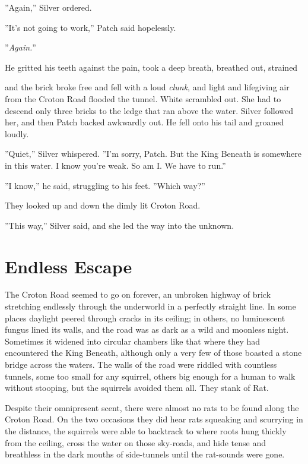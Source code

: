\documentclass[12pt]{book}
\begin{document}
''Again,'' Silver ordered.

''It's not going to work,'' Patch said hopelessly.

''{\it Again.}''

He gritted his teeth against the pain, took a deep breath, breathed out, strained %

and the brick broke free and fell with a loud {\it clunk}, and light and lifegiving air from the Croton Road flooded the tunnel. White scrambled out. She had to descend only three bricks to the ledge that ran above the water. Silver followed her, and then Patch backed awkwardly out. He fell onto his tail and groaned loudly.

''Quiet,'' Silver whispered. ''I'm sorry, Patch. But the King Beneath is somewhere in this water. I know you're weak. So am I. We have to run.''

''I know,'' he said, struggling to his feet. ''Which way?''

They looked up and down the dimly lit Croton Road.

''This way,'' Silver said, and she led the way into the unknown.


\section{Endless Escape}

The Croton Road seemed to go on forever, an unbroken highway of brick stretching endlessly through the underworld in a perfectly straight line. In some places daylight peered through cracks in its ceiling; in others, no luminescent fungus lined its walls, and the road was as dark as a wild and moonless night. Sometimes it widened into circular chambers like that where they had encountered the King Beneath, although only a very few of those boasted a stone bridge across the waters. The walls of the road were riddled with countless tunnels, some too small for any squirrel, others big enough for a human to walk without stooping, but the squirrels avoided them all. They stank of Rat.

Despite their omnipresent scent, there were almost no rats to be found along the Croton Road. On the two occasions they did hear rats squeaking and scurrying in the distance, the squirrels were able to backtrack to where roots hung thickly from the ceiling, cross the water on those sky-roads, and hide tense and breathless in the dark mouths of side-tunnels until the rat-sounds were gone.
\end{document}
